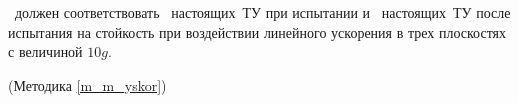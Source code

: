 \dut \  должен соответствовать \treb \ настоящих~ТУ при испытании и \trebafter \ настоящих~ТУ после испытания на стойкость при воздействии линейного ускорения в трех плоскостях с величиной $10g$.

\begin{flushright}
	(Методика \ref{m_m_yskor})
\end{flushright}
